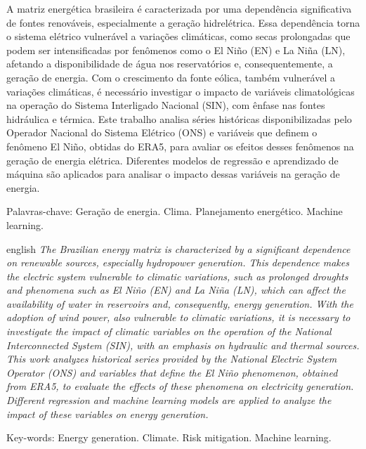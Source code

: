 \begin{resumo}
\noindent
A matriz energética brasileira é caracterizada por uma dependência significativa de fontes renováveis, especialmente a
geração hidrelétrica. Essa dependência torna o sistema elétrico vulnerável a variações climáticas, como secas 
prolongadas que podem ser intensificadas por fenômenos como o El Niño (EN) e La Niña (LN), afetando a disponibilidade 
de água nos reservatórios e, consequentemente, a geração de energia. Com o crescimento da fonte eólica, também vulnerável a 
variações climáticas, é necessário investigar o impacto de variáveis climatológicas na operação do Sistema Interligado Nacional 
(SIN), com ênfase nas fontes hidráulica e térmica. Este trabalho analisa séries históricas disponibilizadas pelo Operador Nacional 
do Sistema Elétrico (ONS) e variáveis que definem o fenômeno El Niño, obtidas do ERA5, para avaliar os efeitos desses fenômenos
na geração de energia elétrica. Diferentes modelos de regressão e aprendizado de máquina são aplicados para analisar
o impacto dessas variáveis na geração de energia.

\vspace{0.2cm}
\noindent
Palavras-chave: Geração de energia. Clima. Planejamento energético. Machine learning.
\end{resumo}

\begin{resumo}[Abstract]	
\begin{otherlanguage*}{english}
\noindent 
\textit{The Brazilian energy matrix is characterized by a significant dependence on renewable sources, especially hydropower generation. 
This dependence makes the electric system vulnerable to climatic variations, such as prolonged droughts and phenomena such as
El Niño (EN) and La Niña (LN), which can affect the availability of water in reservoirs and, consequently, energy generation. 
With the adoption of wind power, also vulnerable to climatic variations, it is necessary to investigate the impact of 
climatic variables on the operation of the National Interconnected System (SIN), with an emphasis on hydraulic and 
thermal sources. This work analyzes historical series provided by the National Electric System Operator (ONS) and variables 
that define the El Niño phenomenon, obtained from ERA5, to evaluate the effects of these phenomena on electricity generation. 
Different regression and machine learning models are applied to analyze the impact of these variables on energy generation.}

\vspace{0.2cm}
\noindent
Key-words: Energy generation. Climate. Risk mitigation. Machine learning.
\end{otherlanguage*}
\end{resumo}